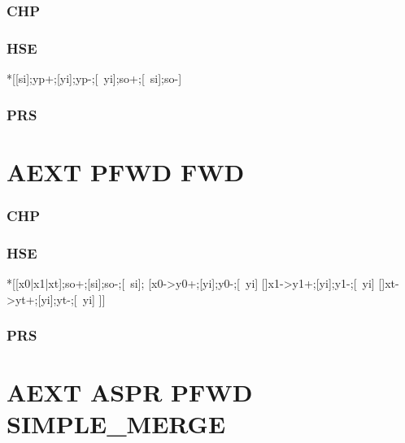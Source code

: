 \documentclass{article}
\begin{document}
\subsubsection*{CHP}

\subsubsection*{HSE}
\begin{hse}
*[[si];yp+;[yi];yp-;[~yi];so+;[~si];so-]
\end{hse}

\subsubsection*{PRS}

\section{AEXT PFWD FWD}

\subsubsection*{CHP}

\subsubsection*{HSE}

\begin{hse}
*[[x0|x1|xt];so+;[si];so-;[~si];
  [x0->y0+;[yi];y0-;[~yi]
  []x1->y1+;[yi];y1-;[~yi]
  []xt->yt+;[yi];yt-;[~yi]
 ]]
\end{hse}

\subsubsection*{PRS}

\section{AEXT ASPR PFWD SIMPLE\_MERGE}
\end{document}
